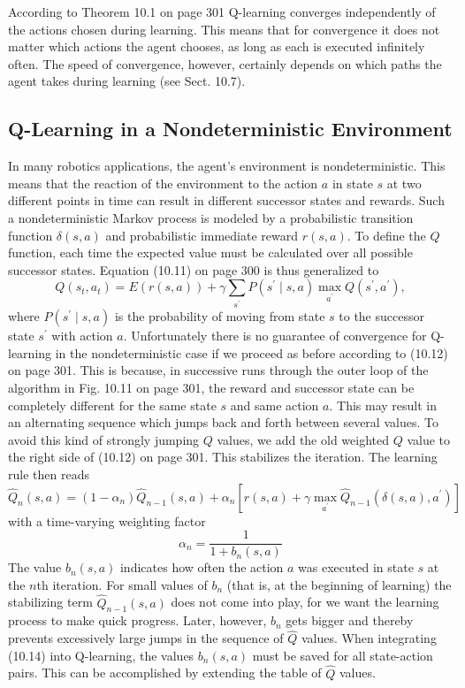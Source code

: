 \documentclass[10pt]{book}
\begin{document}
According to Theorem 10.1 on page 301 Q-learning converges independently of the actions chosen during learning. This means that for convergence it does not matter which actions the agent chooses, as long as each is executed infinitely often. The speed of convergence, however, certainly depends on which paths the agent takes during learning (see Sect. 10.7).

\subsection{Q-Learning in a Nondeterministic Environment}
In many robotics applications, the agent's environment is nondeterministic. This means that the reaction of the environment to the action $a$ in state $s$ at two different points in time can result in different successor states and rewards. Such a nondeterministic Markov process is modeled by a probabilistic transition function $\delta(s, a)$ and probabilistic immediate reward $r(s, a)$. To define the $Q$ function, each time the expected value must be calculated over all possible successor states. Equation (10.11) on page 300 is thus generalized to
\begin{equation*}
Q\left(s_{t}, a_{t}\right)=E(r(s, a))+\gamma \sum_{s^{\prime}} P\left(s^{\prime} \mid s, a\right) \max _{a^{\prime}} Q\left(s^{\prime}, a^{\prime}\right), \tag{10.13}
\end{equation*}
where $P\left(s^{\prime} \mid s, a\right)$ is the probability of moving from state $s$ to the successor state $s^{\prime}$ with action $a$. Unfortunately there is no guarantee of convergence for Q-learning in the nondeterministic case if we proceed as before according to (10.12) on page 301. This is because, in successive runs through the outer loop of the algorithm in Fig. 10.11 on page 301, the reward and successor state can be completely different for the same state $s$ and same action $a$. This may result in an alternating sequence which jumps back and forth between several values. To avoid this kind of strongly jumping $Q$ values, we add the old weighted $Q$ value to the right side of (10.12) on page 301. This stabilizes the iteration. The learning rule then reads
\begin{equation*}
\hat{Q}_{n}(s, a)=\left(1-\alpha_{n}\right) \hat{Q}_{n-1}(s, a)+\alpha_{n}\left[r(s, a)+\gamma \max _{a^{\prime}} \hat{Q}_{n-1}\left(\delta(s, a), a^{\prime}\right)\right] \tag{10.14}
\end{equation*}
with a time-varying weighting factor
\[
\alpha_{n}=\frac{1}{1+b_{n}(s, a)}
\]
The value $b_{n}(s, a)$ indicates how often the action $a$ was executed in state $s$ at the $n$th iteration. For small values of $b_{n}$ (that is, at the beginning of learning) the stabilizing term $\hat{Q}_{n-1}(s, a)$ does not come into play, for we want the learning process to make quick progress. Later, however, $b_{n}$ gets bigger and thereby prevents excessively large jumps in the sequence of $\hat{Q}$ values. When integrating (10.14) into Q-learning, the values $b_{n}(s, a)$ must be saved for all state-action pairs. This can be accomplished by extending the table of $\hat{Q}$ values.
\end{document}
